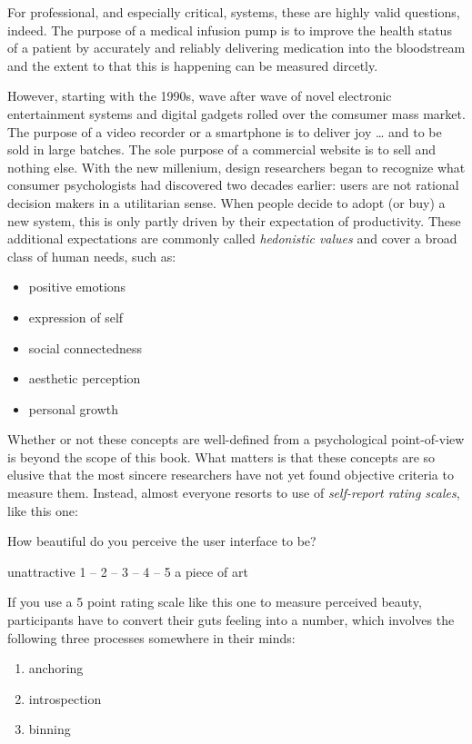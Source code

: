 \documentclass[]{svmono}
\providecommand{\tightlist}{%
  \setlength{\itemsep}{0pt}\setlength{\parskip}{0pt}}
\theoremstyle{definition}
\theoremstyle{definition}
\theoremstyle{definition}
\theoremstyle{remark}
\begin{document}
For professional, and especially critical, systems, these are highly
valid questions, indeed. The purpose of a medical infusion pump is to
improve the health status of a patient by accurately and reliably
delivering medication into the bloodstream and the extent to that this
is happening can be measured dircetly.

However, starting with the 1990s, wave after wave of novel electronic
entertainment systems and digital gadgets rolled over the comsumer mass
market. The purpose of a video recorder or a smartphone is to deliver
joy \ldots{} and to be sold in large batches. The sole purpose of a
commercial website is to sell and nothing else. With the new millenium,
design researchers began to recognize what consumer psychologists had
discovered two decades earlier: users are not rational decision makers
in a utilitarian sense. When people decide to adopt (or buy) a new
system, this is only partly driven by their expectation of productivity.
These additional expectations are commonly called \emph{hedonistic
values} and cover a broad class of human needs, such as:

\begin{itemize}
\tightlist
\item
  positive emotions
\item
  expression of self
\item
  social connectedness
\item
  aesthetic perception
\item
  personal growth
\end{itemize}

Whether or not these concepts are well-defined from a psychological
point-of-view is beyond the scope of this book. What matters is that
these concepts are so elusive that the most sincere researchers have not
yet found objective criteria to measure them. Instead, almost everyone
resorts to use of \emph{self-report rating scales}, like this one:

How beautiful do you perceive the user interface to be?

unattractive 1 -- 2 -- 3 -- 4 -- 5 a piece of art

If you use a 5 point rating scale like this one to measure perceived
beauty, participants have to convert their guts feeling into a number,
which involves the following three processes somewhere in their minds:

\begin{enumerate}
\def\labelenumi{\arabic{enumi}.}
\tightlist
\item
  anchoring
\item
  introspection
\item
  binning
\end{enumerate}
\end{document}

